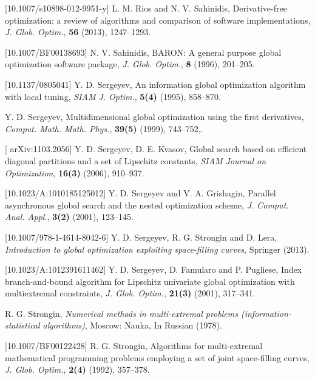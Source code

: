 \documentclass{aims}
\theoremstyle{definition}
\begin{document}
\begin{thebibliography}{10}
[10.1007/s10898-012-9951-y]
\newblock L. M. Rios and N. V. Sahinidis,
\newblock Derivative-free optimization: a review of algorithms and comparison of software implementations,
\newblock \emph{J. Glob. Optim.}, \textbf{56} (2013), 1247--1293.

[10.1007/BF00138693]
\newblock N. V. Sahinidis,
\newblock BARON: A general purpose global optimization software package,
\newblock \emph{J. Glob. Optim.}, \textbf{8} (1996), 201--205.

[10.1137/0805041]
\newblock Y. D. Sergeyev,
\newblock An information global optimization algorithm with local tuning,
\newblock \emph{SIAM J. Optim.}, \textbf{5(4)} (1995), 858--870.

\newblock Y. D. Sergeyev,
\newblock Multidimensional global optimization using the first derivatives,
\newblock \emph{Comput. Math. Math. Phys.}, \textbf{39(5)} (1999), 743--752,.

[	arXiv:1103.2056]
\newblock Y. D. Sergeyev, D. E. Kvasov,
\newblock Global search based on efficient diagonal partitions and a set of Lipschitz constants,
\newblock \emph{SIAM Journal on Optimization}, \textbf{16(3)} (2006), 910--937.

[10.1023/A:1010185125012]
\newblock Y. D. Sergeyev and V. A. Grishagin,
\newblock Parallel asynchronous global search and the nested optimization scheme,
\newblock \emph{J. Comput. Anal. Appl.}, \textbf{3(2)} (2001), 123--145.

[10.1007/978-1-4614-8042-6]
\newblock Y. D. Sergeyev, R. G. Strongin and D. Lera,
\newblock \emph{Introduction to global optimization exploiting space-filling curves},
\newblock Springer (2013).

[10.1023/A:1012391611462]
\newblock Y. D. Sergeyev, D. Famularo and P. Pugliese,
\newblock Index branch-and-bound algorithm for Lipschitz univariate global optimization with multiextremal constraints,
\newblock \emph{J. Glob. Optim.}, \textbf{21(3)} (2001), 317--341.

\newblock R. G. Strongin,
\newblock \emph{Numerical methods in multi-extremal problems (information-statistical algorithms)},
\newblock Moscow: Nauka, In Russian (1978).

[10.1007/BF00122428]
\newblock R. G. Strongin,
\newblock Algorithms for multi-extremal mathematical programming problems employing a set of joint space-filling curves,
\newblock \emph{J. Glob. Optim.}, \textbf{2(4)} (1992), 357--378.


\end{thebibliography}
\end{document}

